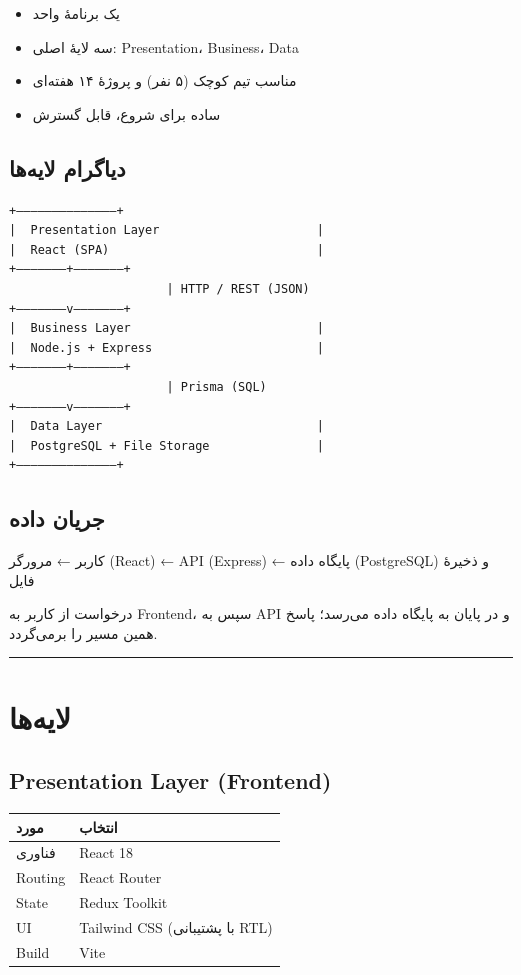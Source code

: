 \documentclass[12pt, a4paper]{article}
\begin{document}
\begin{itemize}
\tightlist
\item
  یک برنامهٔ واحد
\item
  سه لایهٔ اصلی: Presentation، Business، Data
\item
  مناسب تیم کوچک (۵ نفر) و پروژهٔ ۱۴ هفته‌ای
\item
  ساده برای شروع، قابل گسترش
\end{itemize}

\subsection{دیاگرام لایه‌ها}

\begin{LTR}
\begin{verbatim}
+——————————————+
|  Presentation Layer                      |
|  React (SPA)                             |
+———————+——————–+
                      | HTTP / REST (JSON)
+———————v——————–+
|  Business Layer                          |
|  Node.js + Express                       |
+———————+——————–+
                      | Prisma (SQL)
+———————v——————–+
|  Data Layer                              |
|  PostgreSQL + File Storage               |
+——————————————+
\end{verbatim}
\end{LTR}

\subsection{جریان داده}

کاربر ← مرورگر (React) ← API (Express) ← پایگاه داده (PostgreSQL) و ذخیرهٔ فایل

درخواست از کاربر به Frontend، سپس به API و در پایان به پایگاه داده می‌رسد؛ پاسخ همین مسیر را برمی‌گردد.

\begin{center}\rule{0.5\linewidth}{0.5pt}\end{center}

\section{لایه‌ها}

\subsection{Presentation Layer (Frontend)}

\begin{longtable}[]{@{}ll@{}}
\toprule\noalign{}
مورد & انتخاب \\
\midrule\noalign{}
\endhead
\bottomrule\noalign{}
\endlastfoot
فناوری & React 18 \\
Routing & React Router \\
State & Redux Toolkit \\
UI & Tailwind CSS (با پشتیبانی RTL) \\
Build & Vite \\
\end{longtable}
\end{document}
